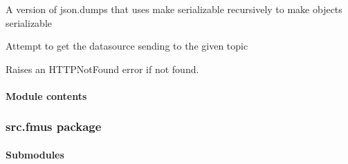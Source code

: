 \documentclass[letterpaper,10pt,english]{sphinxmanual}
\begin{document}

\begin{fulllineitems}
\label{\detokenize{src.datasources:src.datasources.views.dumps}}
A version of json.dumps that uses make serializable recursively to make objects serializable

\end{fulllineitems}


\begin{fulllineitems}
\label{\detokenize{src.datasources:src.datasources.views.try_get_source}}
Attempt to get the datasource sending to the given topic

Raises an HTTPNotFound error if not found.

\end{fulllineitems}



\paragraph{Module contents}
\label{\detokenize{src.datasources:module-src.datasources}}\label{\detokenize{src.datasources:module-contents}}

\subsubsection{src.fmus package}
\label{\detokenize{src.fmus:src-fmus-package}}\label{\detokenize{src.fmus::doc}}

\paragraph{Submodules}
\label{\detokenize{src.fmus:submodules}}
\end{document}
